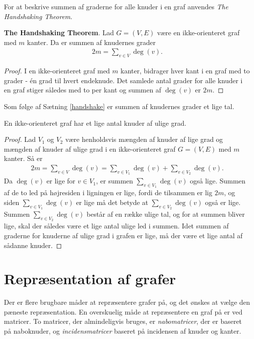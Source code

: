 For at beskrive summen af graderne for alle knuder i en graf anvendes \textit{The Handshaking Theorem}. 

\begin{thm}\label{handshake}
	\textbf{The Handshaking Theorem}.
	Lad $G=(V,E)$ være en ikke-orienteret graf med $m$ kanter.
	Da er summen af knudernes grader
	\begin{align*}
		2m=\sum_{v \in V}\deg(v).
	\end{align*}
\end{thm}

\begin{proof}
	I en ikke-orienteret graf med $m$ kanter, bidrager hver kant i en graf med to grader - én grad til hvert endeknude.
	Det samlede antal grader for alle knuder i en graf stiger således med to per kant og summen af $\deg(v)$ er $2m$. 
\end{proof}

Som følge af Sætning \ref{handshake} er summen af knudernes grader et lige tal.

\begin{thm}
	En ikke-orienteret graf har et lige antal knuder af ulige grad.
\end{thm}

\begin{proof}
	Lad $V_1$ og $V_2$ være henholdsvis mængden af knuder af lige grad og mængden af knuder af ulige grad i en ikke-orienteret graf $G=(V,E)$ med $m$ kanter.
	Så er
	\begin{align*}
		2m=\sum_{v \in V}\deg(v)=\sum_{v \in V_1}\deg(v)+ \sum_{v \in V_2}\deg(v).
	\end{align*}
	Da $\deg(v)$ er lige for $v \in V_1$, er summen $\sum_{v \in V_1}\deg(v)$ også lige.
	Summen af de to led på højresiden i ligningen er lige, fordi de tilsammen er lig $2m$, og siden $\sum_{v \in V_1}\deg(v)$ er lige må det betyde at $\sum_{v \in V_2}\deg(v)$ også er lige.
	Summen $\sum_{v \in V_2}\deg(v)$ består af en række ulige tal, og for at summen bliver lige, skal der således være et lige antal ulige led i summen.
	Idet summen af graderne for knuderne af ulige grad i grafen er lige, må der være et lige antal af sådanne knuder.
\end{proof}

\section{Repræsentation af grafer}
Der er flere brugbare måder at repræsentere grafer på, og det ønskes at vælge den pæneste repræsentation. 
En overskuelig måde at repræsentere en graf på er ved matricer. 
To matricer, der almindeligvis bruges, er \textit{nabomatricer}, der er baseret på naboknuder, og \textit{incidensmatricer} baseret på incidensen af knuder og kanter. 

